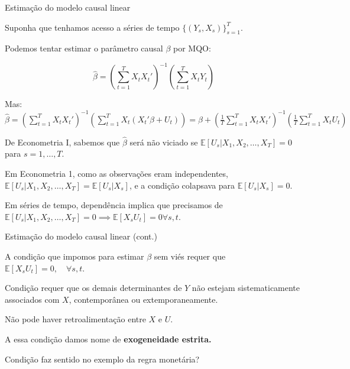 \documentclass[11pt]{beamer}
\newenvironment{wideitemize}{\itemize\addtolength{\itemsep}{10pt}}{\enditemize}
\newenvironment{halfwideitemize}{\itemize\addtolength{\itemsep}{0.5em}}{\enditemize}
\begin{document}
	\begin{frame}{Estimação do modelo causal linear}
		\begin{halfwideitemize}
			\item Suponha que tenhamos acesso a séries de tempo $\{(Y_s, X_s)\}_{s=1}^T$.
			\item Podemos tentar estimar o parâmetro causal $\beta$ por MQO:
			
			$$\hat{\beta} = \left(\sum_{t=1}^T X_t X_t'\right)^{-1}\left(\sum_{t=1}^T X_t Y_t\right) $$
			\item Mas:
			$\hat{\beta}  = \left(\sum_{t=1}^T X_t X_t'\right)^{-1}\left(\sum_{t=1}^T X_t (X_t'\beta + U_t)\right)= \beta + \left(\frac{1}{T}\sum_{t=1}^T X_t X_t'\right)^{-1}\left(\frac{1}{T}\sum_{t=1}^T X_t U_t\right)  $
			\item De Econometria I, sabemos que $\hat{\beta}$ será não viciado se {\color{blue_emph}$\mathbb{E}[U_s|X_1,X_2,\ldots, X_T]=0$} para $s=1,\ldots,T$.
			\begin{halfwideitemize}
				\item Em Econometria 1, como as observações eram independentes, $\mathbb{E}[U_s|X_1,X_2,\ldots, X_T] = \mathbb{E}[U_s|X_s]$, e a condição colapsava para $\mathbb{E}[U_s|X_s] = 0$.
				\item Em séries de tempo, dependência implica que precisamos de $\mathbb{E}[U_s|X_1,X_2,\ldots, X_T] = 0 \implies \mathbb{E}[X_sU_t] = 0 \forall s,t $.
			\end{halfwideitemize}
		\end{halfwideitemize}
	\end{frame}
	\begin{frame}{Estimação do modelo causal linear (cont.)}
		\begin{wideitemize}
			\item A condição que impomos para estimar $\beta$ {\color{blue}sem viés} requer que $\mathbb{E}[X_sU_t] = 0, \quad \forall s,t$.
			\begin{halfwideitemize}
				\item Condição requer que os demais determinantes de $Y$ não estejam sistematicamente associados com $X$, contemporânea ou extemporaneamente.
				\item Não pode haver retroalimentação entre $X$ e $U$.
				\item A essa condição damos nome de \textbf{exogeneidade estrita.}
			\end{halfwideitemize}
			\item Condição faz sentido no exemplo da regra monetária?
		\end{wideitemize}
	\end{frame}
\end{document}
